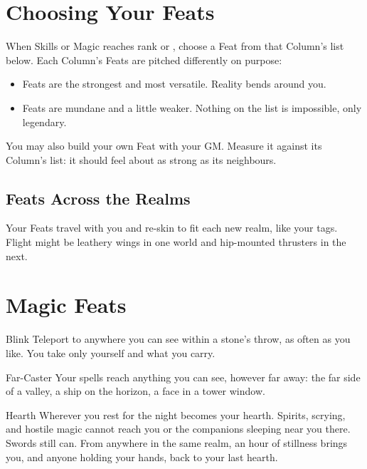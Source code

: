 \section{Choosing Your Feats}

When Skills or Magic reaches rank  or , choose a
Feat from that Column's list below. Each Column's Feats are pitched
differently on purpose:
\begin{itemize}
  \item {} Feats are the strongest and most versatile.
    Reality bends around you.
  \item {} Feats are mundane and a little weaker. Nothing
    on the list is impossible, only legendary.
\end{itemize}
You may also build your own Feat with your GM. Measure it against its
Column's list: it should feel about as strong as its neighbours.

\subsection*{Feats Across the Realms}
Your Feats travel with you and re-skin to fit each new realm, like your
tags. Flight might be leathery wings in one world and hip-mounted
thrusters in the next.

\renewcommand{\realmaccent}{columnMagic}
\section{Magic Feats}

\begin{feat}{Blink}
Teleport to anywhere you can see within a stone's throw, as often as you
like. You take only yourself and what you carry.
\end{feat}

\begin{feat}{Far-Caster}
Your spells reach anything you can see, however far away: the far side
of a valley, a ship on the horizon, a face in a tower window.
\end{feat}

\begin{feat}{Hearth}
Wherever you rest for the night becomes your hearth. Spirits, scrying,
and hostile magic cannot reach you or the companions sleeping near you
there. Swords still can. From anywhere in the same realm, an hour of
stillness brings you, and anyone holding your hands, back to your last
hearth.
\end{feat}

